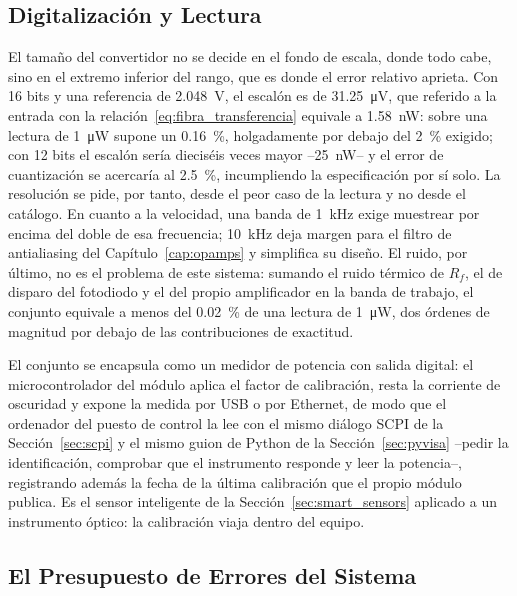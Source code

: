 \subsection{Digitalización y Lectura}\label{sub:fibra_digitalizacion}

El tamaño del convertidor no se decide en el fondo de escala, donde todo cabe, sino en el extremo inferior del rango, que es donde el error relativo aprieta. Con 16 bits y una referencia de \SI{2.048}{\volt}, el escalón es de \SI{31.25}{\micro\volt}, que referido a la entrada con la relación~\eqref{eq:fibra_transferencia} equivale a \SI{1.58}{\nano\watt}: sobre una lectura de \SI{1}{\micro\watt} supone un \SI{0.16}{\percent}, holgadamente por debajo del \SI{2}{\percent} exigido; con 12 bits el escalón sería dieciséis veces mayor --\SI{25}{\nano\watt}-- y el error de cuantización se acercaría al \SI{2.5}{\percent}, incumpliendo la especificación por sí solo. La resolución se pide, por tanto, desde el peor caso de la lectura y no desde el catálogo. En cuanto a la velocidad, una banda de \SI{1}{\kilo\hertz} exige muestrear por encima del doble de esa frecuencia; \SI{10}{\kilo\hertz} deja margen para el filtro de antialiasing del Capítulo~\ref{cap:opamps} y simplifica su diseño. El ruido, por último, no es el problema de este sistema: sumando el ruido térmico de $R_f$, el de disparo del fotodiodo y el del propio amplificador en la banda de trabajo, el conjunto equivale a menos del \SI{0.02}{\percent} de una lectura de \SI{1}{\micro\watt}, dos órdenes de magnitud por debajo de las contribuciones de exactitud.

El conjunto se encapsula como un medidor de potencia con salida digital: el microcontrolador del módulo aplica el factor de calibración, resta la corriente de oscuridad y expone la medida por USB o por Ethernet, de modo que el ordenador del puesto de control la lee con el mismo diálogo SCPI de la Sección~\ref{sec:scpi} y el mismo guion de Python de la Sección~\ref{sec:pyvisa} --pedir la identificación, comprobar que el instrumento responde y leer la potencia--, registrando además la fecha de la última calibración que el propio módulo publica. Es el sensor inteligente de la Sección~\ref{sec:smart_sensors} aplicado a un instrumento óptico: la calibración viaja dentro del equipo.

\subsection{El Presupuesto de Errores del Sistema}\label{sub:fibra_presupuesto}

